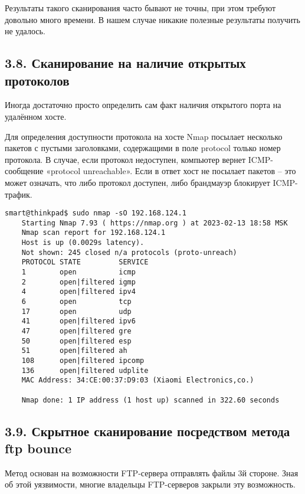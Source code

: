 Результаты такого сканирования часто бывают не точны, при этом требуют довольно много времени. В нашем случае никакие полезные результаты получить не удалось.

\subsection*{3.8. Сканирование на наличие открытых протоколов}

Иногда достаточно просто определить сам факт наличия открытого порта на удалённом хосте.

Для определения доступности протокола на хосте Nmap посылает несколько пакетов с пустыми заголовками, содержащими в поле protocol только номер протокола. В случае, если протокол недоступен, компьютер вернет ICMP-сообщение «protocol unreachable». Если в ответ хост не посылает пакетов -- это может означать, что либо протокол доступен, либо брандмауэр блокирует ICMP-трафик.

\begin{Verbatim}[frame=single]
    smart@thinkpad$ sudo nmap -sO 192.168.124.1
    Starting Nmap 7.93 ( https://nmap.org ) at 2023-02-13 18:58 MSK
    Nmap scan report for 192.168.124.1
    Host is up (0.0029s latency).
    Not shown: 245 closed n/a protocols (proto-unreach)
    PROTOCOL STATE         SERVICE
    1        open          icmp
    2        open|filtered igmp
    4        open|filtered ipv4
    6        open          tcp
    17       open          udp
    41       open|filtered ipv6
    47       open|filtered gre
    50       open|filtered esp
    51       open|filtered ah
    108      open|filtered ipcomp
    136      open|filtered udplite
    MAC Address: 34:CE:00:37:D9:03 (Xiaomi Electronics,co.)

    Nmap done: 1 IP address (1 host up) scanned in 322.60 seconds
\end{Verbatim}

\subsection*{3.9. Скрытное сканирование посредством метода ftp bounce}

Метод основан на возможности FTP-сервера отправлять файлы 3й стороне. Зная об этой уязвимости, многие владельцы FTP-серверов закрыли эту возможность.

